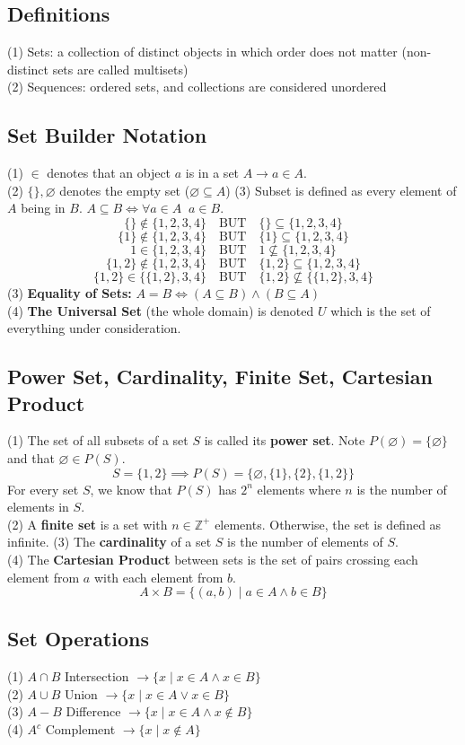 \subsection{Definitions}
(1) Sets: a collection of distinct objects in which order does not matter (non-distinct sets are called multisets)\\
(2) Sequences: ordered sets, and collections are considered unordered
\subsection{Set Builder Notation}
(1) $\in$ denotes that an object $a$ is in a set $A \rightarrow a \in A$.\\
(2) $\{\}, \varnothing$ denotes the empty set ($\varnothing \subseteq A$)
(3) Subset is defined as every element of $A$ being in $B$. $A \subseteq B \iff \forall a \in A\;\;a \in B$.
$$
\{\} \notin \{1,2,3,4\}\quad\text{BUT}\quad\{\} \subseteq \{1,2,3,4\}
$$
$$
\{1\} \notin \{1,2,3,4\}\quad\text{BUT}\quad\{1\} \subseteq \{1,2,3,4\}
$$
$$
1 \in \{1,2,3,4\}\quad\text{BUT}\quad 1 \nsubseteq \{1,2,3,4\}
$$
$$
\{1,2\} \notin \{1,2,3,4\}\quad\text{BUT}\quad\{1,2\} \subseteq \{1,2,3,4\}
$$
$$
\{1,2\} \in \{\{1,2\},3,4\}\quad\text{BUT}\quad\{1,2\} \nsubseteq \{\{1,2\},3,4\}
$$
(3) \textbf{Equality of Sets:} $A = B \iff (A \subseteq B) \wedge (B \subseteq A)$ \\
(4) \textbf{The Universal Set} (the whole domain) is denoted $U$ which is the set of everything under consideration.
\subsection{Power Set, Cardinality, Finite Set, Cartesian Product}
(1) The set of all subsets of a set $S$ is called its \textbf{power set}. Note $P(\varnothing) = \{\varnothing\}$ and that $\varnothing \in P(S)$.
$$
S = \{1,2\} \implies P(S) = \{\varnothing,\{1\},\{2\},\{1,2\}\}
$$
For every set $S$, we know that $P(S)$ has $2^{n}$ elements where $n$ is the number of elements in $S$.\\
(2) A \textbf{finite set} is a set with $n \in \mathbb{Z}^+$ elements. Otherwise, the set is defined as infinite.
(3) The \textbf{cardinality} of a set $S$ is the number of elements of $S$. \\
(4) The \textbf{Cartesian Product} between sets is the set of pairs crossing each element from $a$ with each element from $b$. 
$$
A \times B = \{(a,b)\;|\;a \in A \wedge b \in B\}
$$
\subsection{Set Operations}
(1) $A \cap B$ Intersection $\rightarrow \{x\;|\;x \in A \wedge x \in B\}$\\
(2) $A\cup B$ Union $\rightarrow \{x\;|\;x \in A \vee x \in B\}$\\
(3) $A-B$ Difference $\rightarrow \{x\;|\;x \in A \wedge x \notin B\}$\\
(4) $A^c$ Complement $\rightarrow \{x\;|\;x \notin A\}$
